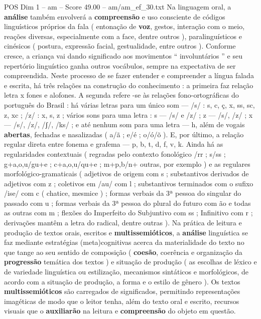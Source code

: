 \begin{textsample}{POS Dim 1 – am – Score 49.00 – am/am\_ef\_30.txt}
Na linguagem oral, a \textbf{análise} também envolverá a \textbf{compreensão} e uso consciente de códigos linguísticos próprios da fala ( entonação de \textbf{voz}, gestos, interação com o meio, reações diversas, especialmente com a face, dentre outros ), paralinguísticos e cinésicos ( postura, expressão facial, gestualidade, entre outros ).
Conforme cresce, a criança vai dando significado aos movimentos “ involuntários ” e seu repertório linguístico ganha outros vocábulos, sempre na expectativa de ser compreendida.
Neste processo de se fazer entender e compreender a língua falada e escrita, há três relações na construção do conhecimento : a primeira faz relação letra x fones e alofones.
A segunda refere -se às relações fono-ortográficas do português do Brasil : há várias letras para um único som — /s/ : s, c, ç, x, ss, sc, z, xc ; /z/ : x, s, z ; vários sons para uma letra : s — /s/ e /z/ ; z — /s/, /z/ ; x — /s/, /z/, /ʃ/, /ks/ ; e até nenhum som para uma letra — h, além de vogais \textbf{abertas}, fechadas e nasalizadas ( a/ã ; e/é ; o/ó/õ ).
E, por último, a relação regular direta entre fonema e grafema — p, b, t, d, f, v, k.
Ainda há as regularidades contextuais ( regradas pelo contexto fonológico /rr ; s/ss ; g+a,o,u/gu+e ; c+a,o,u/qu+e ; m+p,b/n+ outras, por exemplo ) e as regulares morfológico-gramaticais ( adjetivos de origem com s ; substantivos derivados de adjetivos com z ; coletivos em /au/ com l ; substantivos terminados com o sufixo /ise/ com c ( chatice, mesmice ) ; formas verbais da 3ª pessoa do singular do passado com u ; formas verbais da 3ª pessoa do plural do futuro com ão e todas as outras com m ; flexões do Imperfeito do Subjuntivo com ss ; Infinitivo com r ; derivações mantêm a letra do radical, dentre outras ).
Na prática de leitura e produção de textos orais, escritos e \textbf{multissemióticos}, a \textbf{análise} linguística se faz mediante estratégias (meta)cognitivas acerca da materialidade do texto no que tange ao seu sentido de composição ( \textbf{coesão}, coerência e organização da \textbf{progressão} temática dos textos ) e situação de produção ( as escolhas de léxico e de variedade linguística ou estilização, mecanismos sintáticos e morfológicos, de acordo com a situação de produção, a forma e o estilo de gênero ).
Os textos \textbf{multissemióticos} são carregados de significados, permitindo representações imagéticas de modo que o leitor tenha, além do texto oral e escrito, recursos visuais que o \textbf{auxiliarão} na leitura e \textbf{compreensão} do objeto em questão.

\end{textsample}

